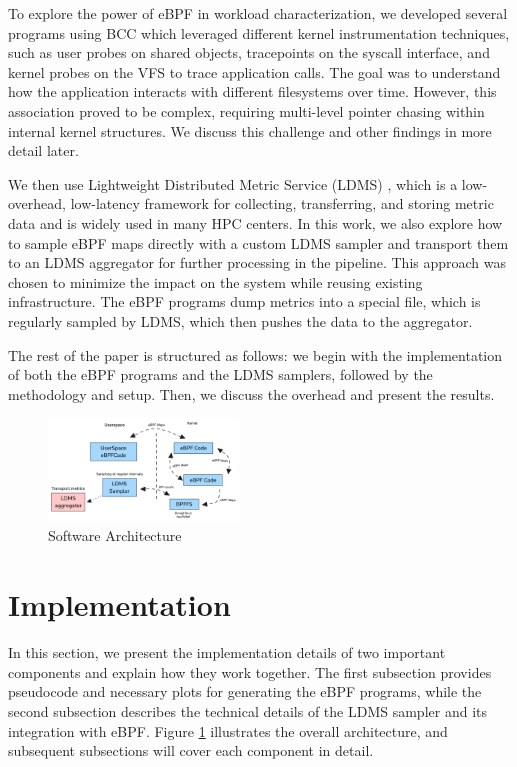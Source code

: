 \documentclass[sigconf]{acmart}
\begin{document}
To explore the power of eBPF in workload characterization, we developed several programs using BCC which leveraged different kernel instrumentation techniques, such as user probes on shared objects, tracepoints on the syscall interface, and kernel probes on the VFS to trace application calls. The goal was to understand how the application interacts with different filesystems over time. However, this association proved to be complex, requiring multi-level pointer chasing within internal kernel structures. We discuss this challenge and other findings in more detail later.

We then use Lightweight Distributed Metric Service (LDMS) \cite{ldms}, which is a low-overhead, low-latency framework for collecting, transferring, and storing metric data and is widely used in many HPC centers. In this work, we also explore how to sample eBPF maps directly with a custom LDMS sampler and transport them to an LDMS aggregator for further processing in the pipeline. This approach was chosen to minimize the impact on the system while reusing existing infrastructure. The eBPF programs dump metrics into a special file, which is regularly sampled by LDMS, which then pushes the data to the aggregator.

The rest of the paper is structured as follows: we begin with the implementation of both the eBPF programs and the LDMS samplers, followed by the methodology and setup. Then, we discuss the overhead and present the results.

\begin{figure}
    \centering
    \includegraphics[width=0.45\textwidth]{images/arch.png}
    \caption{Software Architecture}
    \label{fig:arch}
\end{figure}

\section{Implementation}
In this section, we present the implementation details of two important components and explain how they work together. The first subsection provides pseudocode and necessary plots for generating the eBPF programs, while the second subsection describes the technical details of the LDMS sampler and its integration with eBPF. Figure \ref{fig:arch} illustrates the overall architecture, and subsequent subsections will cover each component in detail.
\end{document}
